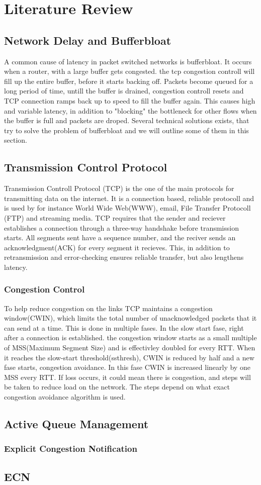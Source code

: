 \chapter{Literature Review}


\section{Network Delay and Bufferbloat}
A common cause of latency in packet switched networks is bufferbloat. It occurs when a router, with a 
large buffer gets congested. the tcp congestion controll will fill up the entire buffer, before 
it starts backing off. Packets become queued for a long period of time, untill the buffer is drained,
congestion controll resets and TCP connection ramps back up to speed to fill the buffer again.
This causes high and variable latency, in addition to "blocking" the bottleneck for other flows
when the buffer is full and packets are droped. 
Several technical solutions exists, that try to solve the problem of bufferbloat and we will outline 
some of them  in this section.
\section{Transmission Control Protocol}
Transmission Controll Protocol (TCP) is the one of the main protocols for transmitting data on the internet.
It is a connection based, reliable protocoll and is used by for instance World Wide Web(WWW), email, 
File Transfer Protocoll (FTP) and streaming media. TCP requires that the sender and reciever establishes a connection 
through a three-way handshake before transmission starts. All segments sent have a sequence number, and the reciver sends 
an acknowledgment(ACK) for every segment it recieves. This, in addition to retransmission and error-checking ensures
reliable transfer, but also lengthens latency.

\subsection{Congestion Control}
To help reduce congestion on the links TCP maintains a congestion window(CWIN), which limits the total number of 
unacknowledged packets that it can send at a time. This is  done in multiple fases.
In the slow start fase,  right after a connection is established. the congestion window starts as a small multiple 
of MSS(Maximum Segment Size) and is effectivley doubled for every RTT. When it reaches the slow-start threshold(ssthresh),
CWIN is reduced by half and a new fase starts, congestion avoidance. In this fase CWIN is increased linearly by one MSS 
every RTT. If loss occurs, it could mean there is congestion, and steps will be taken to reduce load on the
network. The steps depend on what exact congestion avoidance algorithm is used.



\section{Active Queue Management}

\subsection{Explicit Congestion Notification}



\section{ECN}